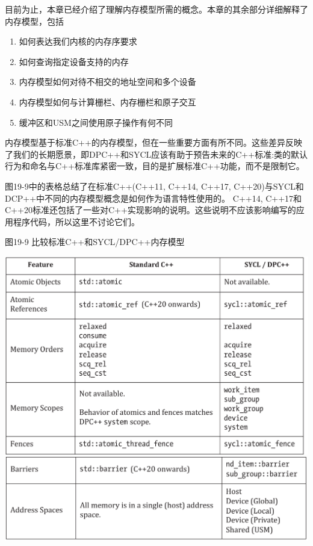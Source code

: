 目前为止，本章已经介绍了理解内存模型所需的概念。本章的其余部分详细解释了内存模型，包括\par

\begin{enumerate}
	\item 如何表达我们内核的内存序要求
	\item 如何查询指定设备支持的内存
	\item 内存模型如何对待不相交的地址空间和多个设备
	\item 内存模型如何与计算栅栏、内存栅栏和原子交互
	\item 缓冲区和USM之间使用原子操作有何不同
\end{enumerate}

内存模型基于标准C++的内存模型，但在一些重要方面有所不同。这些差异反映了我们的长期愿景，即DPC++和SYCL应该有助于预告未来的C++标准:类的默认行为和命名与C++标准库紧密一致，目的是扩展标准C++功能，而不是限制它。\par

图19-9中的表格总结了在标准C++(C++11, C++14, C++17, C++20)与SYCL和DCP++中不同的内存模型概念是如何作为语言特性使用的。 C++14, C++17和C++20标准还包括了一些对C++实现影响的说明。这些说明不应该影响编写的应用程序代码，所以这里不讨论它们。\par

\hspace*{\fill} \par %
图19-9 比较标准C++和SYCL/DPC++内存模型
\begin{center}
	\includegraphics[width=1.0\textwidth]{content/chapter-19/images/6}
	\includegraphics[width=1.0\textwidth]{content/chapter-19/images/7}
\end{center}

